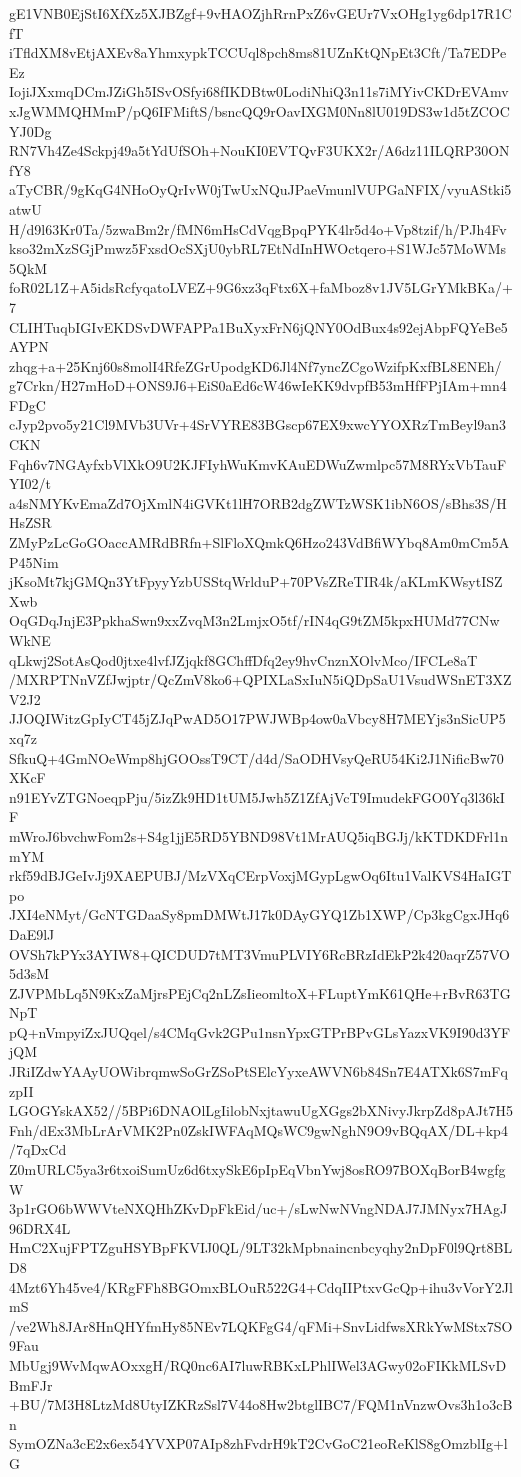 gE1VNB0EjStI6XfXz5XJBZgf+9vHAOZjhRrnPxZ6vGEUr7VxOHg1yg6dp17R1CfT
iTfldXM8vEtjAXEv8aYhmxypkTCCUql8pch8ms81UZnKtQNpEt3Cft/Ta7EDPeEz
IojiJXxmqDCmJZiGh5ISvOSfyi68fIKDBtw0LodiNhiQ3n11s7iMYivCKDrEVAmv
xJgWMMQHMmP/pQ6IFMiftS/bsncQQ9rOavIXGM0Nn8lU019DS3w1d5tZCOCYJ0Dg
RN7Vh4Ze4Sckpj49a5tYdUfSOh+NouKI0EVTQvF3UKX2r/A6dz11ILQRP30ONfY8
aTyCBR/9gKqG4NHoOyQrIvW0jTwUxNQuJPaeVmunlVUPGaNFIX/vyuAStki5atwU
H/d9l63Kr0Ta/5zwaBm2r/fMN6mHsCdVqgBpqPYK4lr5d4o+Vp8tzif/h/PJh4Fv
kso32mXzSGjPmwz5FxsdOcSXjU0ybRL7EtNdInHWOctqero+S1WJc57MoWMs5QkM
foR02L1Z+A5idsRcfyqatoLVEZ+9G6xz3qFtx6X+faMboz8v1JV5LGrYMkBKa/+7
CLIHTuqbIGIvEKDSvDWFAPPa1BuXyxFrN6jQNY0OdBux4s92ejAbpFQYeBe5AYPN
zhqg+a+25Knj60s8molI4RfeZGrUpodgKD6Jl4Nf7yncZCgoWzifpKxfBL8ENEh/
g7Crkn/H27mHoD+ONS9J6+EiS0aEd6cW46wIeKK9dvpfB53mHfFPjIAm+mn4FDgC
cJyp2pvo5y21Cl9MVb3UVr+4SrVYRE83BGscp67EX9xwcYYOXRzTmBeyl9an3CKN
Fqh6v7NGAyfxbVlXkO9U2KJFIyhWuKmvKAuEDWuZwmlpc57M8RYxVbTauFYI02/t
a4sNMYKvEmaZd7OjXmlN4iGVKt1lH7ORB2dgZWTzWSK1ibN6OS/sBhs3S/HHsZSR
ZMyPzLcGoGOaccAMRdBRfn+SlFloXQmkQ6Hzo243VdBfiWYbq8Am0mCm5AP45Nim
jKsoMt7kjGMQn3YtFpyyYzbUSStqWrlduP+70PVsZReTIR4k/aKLmKWsytISZXwb
OqGDqJnjE3PpkhaSwn9xxZvqM3n2LmjxO5tf/rIN4qG9tZM5kpxHUMd77CNwWkNE
qLkwj2SotAsQod0jtxe4lvfJZjqkf8GChffDfq2ey9hvCnznXOlvMco/IFCLe8aT
/MXRPTNnVZfJwjptr/QcZmV8ko6+QPIXLaSxIuN5iQDpSaU1VsudWSnET3XZV2J2
JJOQIWitzGpIyCT45jZJqPwAD5O17PWJWBp4ow0aVbcy8H7MEYjs3nSicUP5xq7z
SfkuQ+4GmNOeWmp8hjGOOssT9CT/d4d/SaODHVsyQeRU54Ki2J1NificBw70XKcF
n91EYvZTGNoeqpPju/5izZk9HD1tUM5Jwh5Z1ZfAjVcT9ImudekFGO0Yq3l36kIF
mWroJ6bvchwFom2s+S4g1jjE5RD5YBND98Vt1MrAUQ5iqBGJj/kKTDKDFrl1nmYM
rkf59dBJGeIvJj9XAEPUBJ/MzVXqCErpVoxjMGypLgwOq6Itu1ValKVS4HaIGTpo
JXI4eNMyt/GcNTGDaaSy8pmDMWtJ17k0DAyGYQ1Zb1XWP/Cp3kgCgxJHq6DaE9lJ
OVSh7kPYx3AYIW8+QICDUD7tMT3VmuPLVIY6RcBRzIdEkP2k420aqrZ57VO5d3sM
ZJVPMbLq5N9KxZaMjrsPEjCq2nLZsIieomltoX+FLuptYmK61QHe+rBvR63TGNpT
pQ+nVmpyiZxJUQqel/s4CMqGvk2GPu1nsnYpxGTPrBPvGLsYazxVK9I90d3YFjQM
JRiIZdwYAAyUOWibrqmwSoGrZSoPtSElcYyxeAWVN6b84Sn7E4ATXk6S7mFqzpII
LGOGYskAX52//5BPi6DNAOlLgIilobNxjtawuUgXGgs2bXNivyJkrpZd8pAJt7H5
Fnh/dEx3MbLrArVMK2Pn0ZskIWFAqMQsWC9gwNghN9O9vBQqAX/DL+kp4/7qDxCd
Z0mURLC5ya3r6txoiSumUz6d6txySkE6pIpEqVbnYwj8osRO97BOXqBorB4wgfgW
3p1rGO6bWWVteNXQHhZKvDpFkEid/uc+/sLwNwNVngNDAJ7JMNyx7HAgJ96DRX4L
HmC2XujFPTZguHSYBpFKVIJ0QL/9LT32kMpbnaincnbcyqhy2nDpF0l9Qrt8BLD8
4Mzt6Yh45ve4/KRgFFh8BGOmxBLOuR522G4+CdqIIPtxvGcQp+ihu3vVorY2JlmS
/ve2Wh8JAr8HnQHYfmHy85NEv7LQKFgG4/qFMi+SnvLidfwsXRkYwMStx7SO9Fau
MbUgj9WvMqwAOxxgH/RQ0nc6AI7luwRBKxLPhlIWel3AGwy02oFIKkMLSvDBmFJr
+BU/7M3H8LtzMd8UtyIZKRzSsl7V44o8Hw2btglIBC7/FQM1nVnzwOvs3h1o3cBn
SymOZNa3cE2x6ex54YVXP07AIp8zhFvdrH9kT2CvGoC21eoReKlS8gOmzblIg+lG
